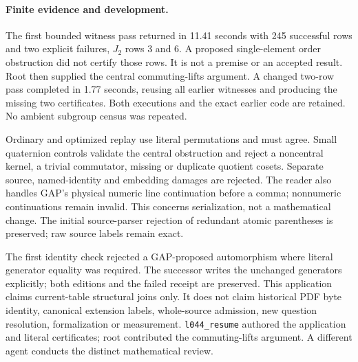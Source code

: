\documentclass[11pt]{article}
\begin{document}
\paragraph{Finite evidence and development.}
The first bounded witness pass returned in 11.41 seconds with 245 successful
rows and two explicit failures, $J_2$ rows 3 and 6. A proposed single-element
order obstruction did not certify those rows. It is not a premise or an
accepted result. Root then supplied the central commuting-lifts argument.
A changed two-row pass completed in 1.77 seconds, reusing all earlier
witnesses and producing the missing two certificates. Both executions and
the exact earlier code are retained. No ambient subgroup census was repeated.

Ordinary and optimized replay use literal permutations and must agree.
Small quaternion controls validate the central obstruction and reject a
noncentral kernel, a trivial commutator, missing or duplicate quotient
cosets. Separate source, named-identity and embedding damages are rejected.
The reader also handles GAP's physical numeric line continuation before
a comma; nonnumeric continuations remain invalid. This concerns serialization,
not a mathematical change. The initial source-parser rejection of redundant
atomic parentheses is preserved; raw source labels remain exact.

The first identity check rejected a GAP-proposed automorphism where literal
generator equality was required. The successor writes the unchanged
generators explicitly; both editions and the failed receipt are preserved.
This application claims current-table structural joins only. It does not
claim historical PDF byte identity, canonical extension labels, whole-source
admission, new question resolution, formalization or measurement.
\texttt{l044\_resume} authored the application and literal certificates;
root contributed the commuting-lifts argument. A different agent conducts
the distinct mathematical review.
\end{document}
